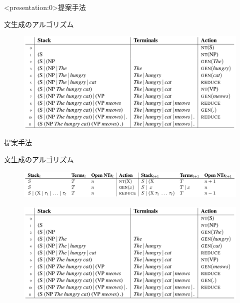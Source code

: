 \documentclass[aspectratio=43,unicode,10pt]{beamer}
\begin{document}
\begin{frame}<presentation:0>{提案手法}
  \begin{block}{文生成のアルゴリズム}
    \begin{figure}
        \includegraphics[width=\textwidth]{fig/fig_4.png}
    \end{figure}
  \end{block}
\end{frame}

\begin{frame}{提案手法}
  \begin{block}{文生成のアルゴリズム}
    \begin{figure}
        \includegraphics[width=\textwidth]{fig/fig_3.png}
    \end{figure}
    \vspace{-1ex} %
    \begin{figure}
        \includegraphics[width=\textwidth]{fig/fig_4.png}
    \end{figure}
  \end{block}
\end{frame}
\end{document}
